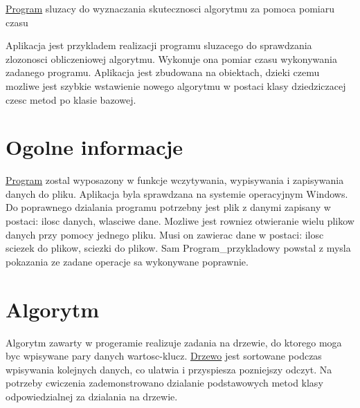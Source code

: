 \hyperlink{class_program}{Program} sluzacy do wyznaczania skutecznosci algorytmu za pomoca pomiaru czasu

Aplikacja jest przykladem realizacji programu sluzacego do sprawdzania zlozonosci obliczeniowej algorytmu. Wykonuje ona pomiar czasu wykonywania zadanego programu. Aplikacja jest zbudowana na obiektach, dzieki czemu mozliwe jest szybkie wstawienie nowego algorytmu w postaci klasy dziedziczacej czesc metod po klasie bazowej.\hypertarget{index_etykieta-ogolne-informacje}{}\section{Ogolne informacje}\label{index_etykieta-ogolne-informacje}
\hyperlink{class_program}{Program} zostal wyposazony w funkcje wczytywania, wypisywania i zapisywania danych do pliku. Aplikacja byla sprawdzana na systemie operacyjnym Windows. Do poprawnego dzialania programu potrzebny jest plik z danymi zapisany w postaci\-: ilosc danych, wlasciwe dane. Mozliwe jest rowniez otwieranie wielu plikow danych przy pomocy jednego pliku. Musi on zawierac dane w postaci\-: ilosc sciezek do plikow, sciezki do plikow. Sam Program\-\_\-przykladowy powstal z mysla pokazania ze zadane operacje sa wykonywane poprawnie.\hypertarget{index_etykieta-algortym}{}\section{Algorytm}\label{index_etykieta-algortym}
Algorytm zawarty w progeramie realizuje zadania na drzewie, do ktorego moga byc wpisywane pary danych wartosc-\/klucz. \hyperlink{class_drzewo}{Drzewo} jest sortowane podczas wpisywania kolejnych danych, co ulatwia i przyspiesza pozniejszy odczyt. Na potrzeby cwiczenia zademonstrowano dzialanie podstawowych metod klasy odpowiedzialnej za dzialania na drzewie. 